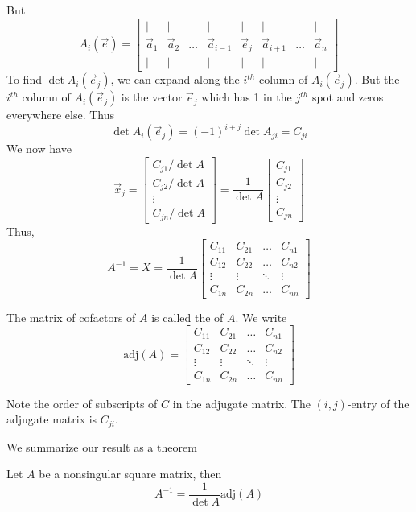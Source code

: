 \documentclass{ximera}
\begin{document}
But
$$A_i(\vec{e})=\begin{bmatrix}
           | & |& &|&|&|&&|\\
        \vec{a}_1 & \vec{a}_2&\dots &\vec{a}_{i-1}&\vec{e}_j&\vec{a}_{i+1}&\dots&\vec{a}_n\\
        | & |& &|&|&|&&|
         \end{bmatrix}$$
To find $\det{A_i(\vec{e}_j)}$, we can expand along the $i^{th}$ column of $A_i(\vec{e}_j)$.  But the $i^{th}$ column of $A_i(\vec{e}_j)$ is the vector $\vec{e}_j$ which has 1 in the $j^{th}$ spot and zeros everywhere else.  Thus
$$\det{A_i(\vec{e}_j)}=(-1)^{i+j}\det{A_{ji}}=C_{ji}$$
We now have
$$\vec{x}_j=\begin{bmatrix}C_{j1}/\det{A}\\C_{j2}/\det{A}\\\vdots\\C_{jn}/\det{A}\end{bmatrix}=\frac{1}{\det{A}}\begin{bmatrix}C_{j1}\\C_{j2}\\\vdots\\C_{jn}\end{bmatrix}$$
Thus,
$$A^{-1}=X=\frac{1}{\det{A}}\begin{bmatrix}C_{11}&C_{21}&\ldots&C_{n1}\\C_{12}&C_{22}&\ldots&C_{n2}\\\vdots&\vdots&\ddots&\vdots\\
C_{1n}&C_{2n}&\ldots&C_{nn}\end{bmatrix}$$
 
The matrix of cofactors of $A$ is called the  of $A$.  We write
$$\text{adj}(A)=\begin{bmatrix}C_{11}&C_{21}&\ldots&C_{n1}\\C_{12}&C_{22}&\ldots&C_{n2}\\\vdots&\vdots&\ddots&\vdots\\
C_{1n}&C_{2n}&\ldots&C_{nn}\end{bmatrix}$$
 
\begin{warning}
Note the order of subscripts of $C$ in the adjugate matrix.  The $(i,j)$-entry of the adjugate matrix is $C_{ji}$.
\end{warning}
 
We summarize our result as a theorem
 
\begin{theorem}\label{th:adjugateinverseformula}
Let $A$ be a nonsingular square matrix, then
$$A^{-1}=\frac{1}{\det{A}}\mbox{adj}(A)$$
\end{theorem}
 
\end{document}
